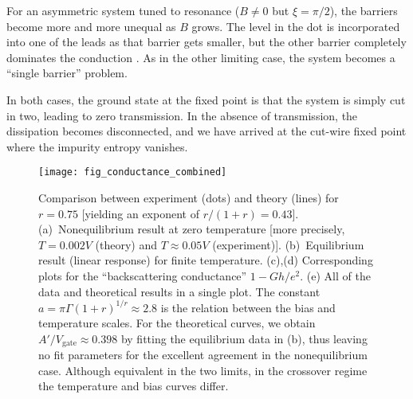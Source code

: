 \documentclass[aps,prb,reprint,floatfix,superscriptaddress,amssymb,amsmath]{revtex4-2}
\newcommand{\Vg}{V_\text{gate}}
\begin{document}
For an asymmetric system tuned to resonance ($B\!\neq\!0$ but $\xi\!=\!\pi/2$), the barriers become more and more unequal as $B$ grows. The level in the dot is incorporated into one of the leads as that barrier gets smaller, but the other barrier completely dominates the conduction \cite{EggertAffleck92}. As in the other limiting case, the system becomes a ``single barrier'' problem. 

In both cases, the ground state at the fixed point is that the system is simply cut in two, leading to zero transmission. In the absence of transmission, the dissipation becomes disconnected, and we have arrived at the cut-wire fixed point where the impurity entropy vanishes. 


\begin{figure*}
  \centering
      \texttt{[image: fig\_conductance\_combined]}
  \caption{\label{fig:sine_gordon}
Comparison between experiment (dots) \cite{GlebData} and
theory (lines) \cite{FendleyMethod} for $r \!=\! 0.75$ [yielding an exponent of $r/(1+r)\!=\!0.43$]. 
(a)~Nonequilibrium result at zero temperature [more precisely, $T \!=\! 0.002 V$ (theory) and $T \!\approx\! 0.05 V$ (experiment)]. (b)~Equilibrium result (linear response) for finite temperature. (c),(d) Corresponding plots for the ``backscattering conductance'' $1 - Gh/e^2$.
(e) All of the data and theoretical results in a single plot. 
The constant $a\!=\! \pi\Gamma(1 + r)^{1/r} \!\approx\! 2.8$ is the relation between the bias and temperature scales. 
For the theoretical curves, we obtain $A'/\Vg\!\approx\! 0.398$ by fitting the equilibrium data in (b), thus leaving no fit parameters for the excellent agreement in the nonequilibrium case. 
Although equivalent in the two limits, in the crossover regime the temperature and bias
curves differ.}
\end{figure*}
\end{document}
